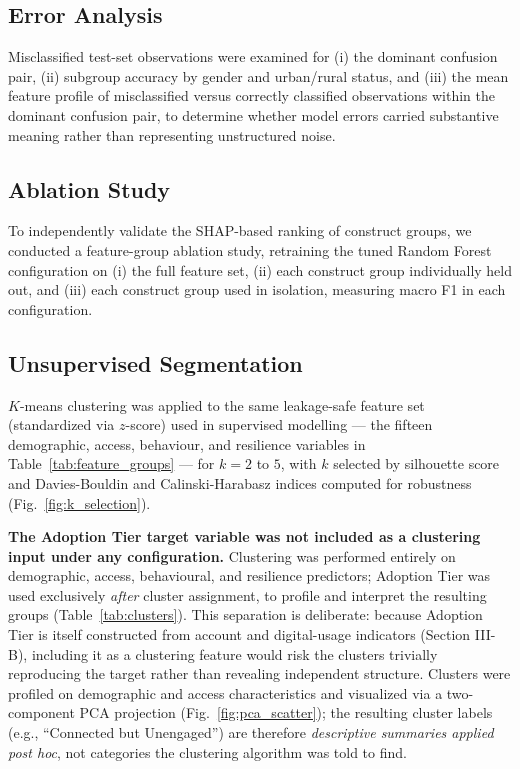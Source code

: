 \documentclass[conference]{IEEEtran}
\begin{document}
\subsection{Error Analysis}
\label{subsec:error_analysis_methods}
Misclassified test-set observations were examined for (i) the dominant confusion pair, (ii) subgroup accuracy by gender and urban/rural status, and (iii) the mean feature profile of misclassified versus correctly classified observations within the dominant confusion pair, to determine whether model errors carried substantive meaning rather than representing unstructured noise.
 
\subsection{Ablation Study}
\label{subsec:ablation_study_methods}
To independently validate the SHAP-based ranking of construct groups, we conducted a feature-group ablation study, retraining the tuned Random Forest configuration on (i) the full feature set, (ii) each construct group individually held out, and (iii) each construct group used in isolation, measuring macro F1 in each configuration.
 
\subsection{Unsupervised Segmentation}
\label{subsec:unsupervised_segmentation}

$K$-means clustering was applied to the same leakage-safe feature set
(standardized via $z$-score) used in supervised modelling --- the fifteen
demographic, access, behaviour, and resilience variables in Table~\ref{tab:feature_groups} --- for
$k=2$ to $5$, with $k$ selected by silhouette score and Davies-Bouldin and
Calinski-Harabasz indices computed for robustness (Fig.~\ref{fig:k_selection}).

\textbf{The Adoption Tier target variable was not included as a clustering
input under any configuration.} Clustering was performed entirely on
demographic, access, behavioural, and resilience predictors; Adoption Tier
was used exclusively \emph{after} cluster assignment, to profile and
interpret the resulting groups (Table~\ref{tab:clusters}). This separation is deliberate:
because Adoption Tier is itself constructed from account and digital-usage
indicators (Section III-B), including it as a clustering feature would
risk the clusters trivially reproducing the target rather than revealing
independent structure. Clusters were profiled on demographic and access
characteristics and visualized via a two-component PCA projection
(Fig.~\ref{fig:pca_scatter}); the resulting cluster labels (e.g., ``Connected but Unengaged'')
are therefore \emph{descriptive summaries applied post hoc}, not
categories the clustering algorithm was told to find.
 
\end{document}
